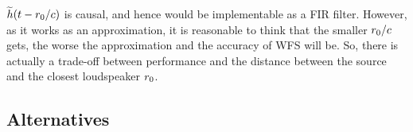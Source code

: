 $\widetilde{h}(t - r_0/c)$ is causal, and hence would be implementable as a FIR filter. However, as it works as an approximation, it is reasonable to think that the smaller $r_0/c$ gets, the worse the approximation and the accuracy of WFS will be. So, there is actually a trade-off between performance and the distance between the source and the closest loudspeaker $r_0$.





\subsection{Alternatives}